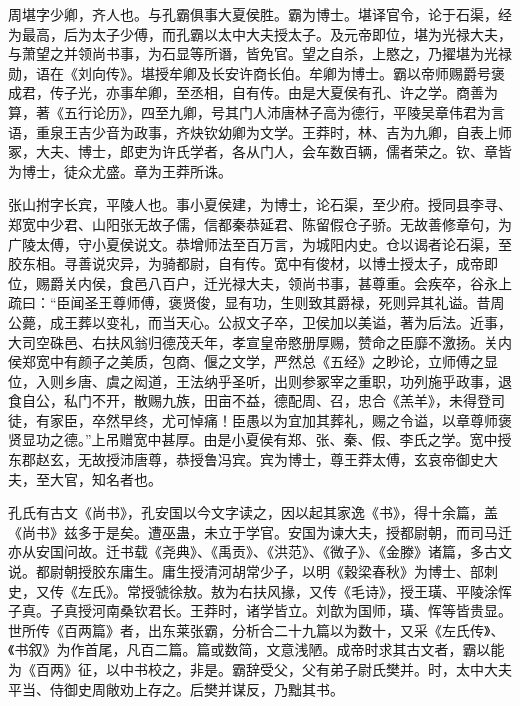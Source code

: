 \documentclass[12pt,UTF8]{ctexbook}
\begin{document}
周堪字少卿，齐人也。与孔霸俱事大夏侯胜。霸为博士。堪译官令，论于石渠，经为最高，后为太子少傅，而孔霸以太中大夫授太子。及元帝即位，堪为光禄大夫，与萧望之并领尚书事，为石显等所谮，皆免官。望之自杀，上愍之，乃擢堪为光禄勋，语在《刘向传》。堪授牟卿及长安许商长伯。牟卿为博士。霸以帝师赐爵号褒成君，传子光，亦事牟卿，至丞相，自有传。由是大夏侯有孔、许之学。商善为算，著《五行论历》，四至九卿，号其门人沛唐林子高为德行，平陵吴章伟君为言语，重泉王吉少音为政事，齐炔钦幼卿为文学。王莽时，林、吉为九卿，自表上师冢，大夫、博士，郎吏为许氏学者，各从门人，会车数百辆，儒者荣之。钦、章皆为博士，徒众尤盛。章为王莽所诛。



张山拊字长宾，平陵人也。事小夏侯建，为博士，论石渠，至少府。授同县李寻、郑宽中少君、山阳张无故子儒，信都秦恭延君、陈留假仓子骄。无故善修章句，为广陵太傅，守小夏侯说文。恭增师法至百万言，为城阳内史。仓以谒者论石渠，至胶东相。寻善说灾异，为骑都尉，自有传。宽中有俊材，以博士授太子，成帝即位，赐爵关内侯，食邑八百户，迁光禄大夫，领尚书事，甚尊重。会疾卒，谷永上疏曰：“臣闻圣王尊师傅，褒贤俊，显有功，生则致其爵禄，死则异其礼谥。昔周公薨，成王葬以变礼，而当天心。公叔文子卒，卫侯加以美谥，著为后法。近事，大司空硃邑、右扶风翁归德茂夭年，孝宣皇帝愍册厚赐，赞命之臣靡不激扬。关内侯郑宽中有颜子之美质，包商、偃之文学，严然总《五经》之眇论，立师傅之显位，入则乡唐、虞之闳道，王法纳乎圣听，出则参冢宰之重职，功列施乎政事，退食自公，私门不开，散赐九族，田亩不益，德配周、召，忠合《羔羊》，未得登司徒，有家臣，卒然早终，尤可悼痛！臣愚以为宜加其葬礼，赐之令谥，以章尊师褒贤显功之德。”上吊赠宽中甚厚。由是小夏侯有郑、张、秦、假、李氏之学。宽中授东郡赵玄，无故授沛唐尊，恭授鲁冯宾。宾为博士，尊王莽太傅，玄哀帝御史大夫，至大官，知名者也。



孔氏有古文《尚书》，孔安国以今文字读之，因以起其家逸《书》，得十余篇，盖《尚书》兹多于是矣。遭巫蛊，未立于学官。安国为谏大夫，授都尉朝，而司马迁亦从安国问故。迁书载《尧典》、《禹贡》、《洪范》、《微子》、《金滕》诸篇，多古文说。都尉朝授胶东庸生。庸生授清河胡常少子，以明《穀梁春秋》为博士、部刺史，又传《左氏》。常授虢徐敖。敖为右扶风掾，又传《毛诗》，授王璜、平陵涂恽子真。子真授河南桑钦君长。王莽时，诸学皆立。刘歆为国师，璜、恽等皆贵显。世所传《百两篇》者，出东莱张霸，分析合二十九篇以为数十，又采《左氏传》、《书叙》为作首尾，凡百二篇。篇或数简，文意浅陋。成帝时求其古文者，霸以能为《百两》征，以中书校之，非是。霸辞受父，父有弟子尉氏樊并。时，太中大夫平当、侍御史周敞劝上存之。后樊并谋反，乃黜其书。
\end{document}
